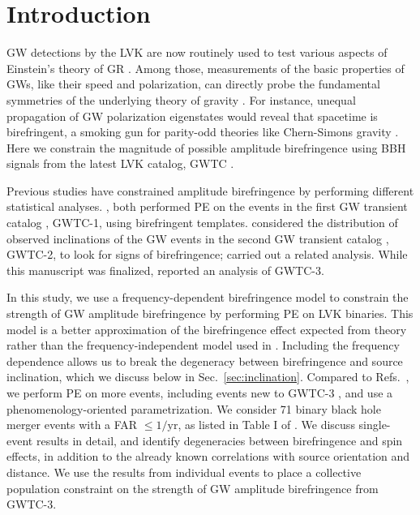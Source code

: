 \documentclass[aps,prd,twocolumn,superscriptaddress,preprintnumbers,nofootinbib]{revtex4-2}
\begin{document}
\section{Introduction}
\label{sec:Introduction}
\Ac{GW} detections by the \ac{LVK} \citep{LIGO, Virgo, KAGRA} are now routinely used to test various aspects of Einstein's theory of \ac{GR} \citep{LIGOScientific:2016lio,LIGOScientific:2018dkp,LIGOScientific:2021sio}.
Among those, measurements of the basic properties of \acp{GW}, like their speed and polarization, can directly probe the fundamental symmetries of the underlying theory of gravity \citep{Will:2018bme}.
For instance, unequal propagation of \ac{GW} polarization eigenstates would reveal that spacetime is birefringent, a smoking gun for parity-odd theories like Chern-Simons gravity \citep{Lue:1998mq,Jackiw:2003pm,Alexander:2009tp,Sopuerta:2009iy}.
Here we constrain the magnitude of possible amplitude birefringence using \ac{BBH} signals from the latest \ac{LVK} catalog, GWTC \citep{GWTC-3}.

Previous studies have constrained amplitude birefringence by performing different statistical analyses.
\citet{Yamada_2020}, \citet{Wang_2021} both performed \ac{PE} on the events in the first \ac{GW} transient catalog \citep{GWTC-1}, GWTC-1, using birefringent templates.
\citet{Okounkova_2022} considered the distribution of observed inclinations of the \ac{GW} events in the second \ac{GW} transient catalog \citep{GWTC-2}, GWTC-2, to look for signs of birefringence; \citet{Vitale:2022pmu} carried out a related analysis.
While this manuscript was finalized, \citet{Zhu:2023wci} reported an analysis of GWTC-3.

In this study, we use a frequency-dependent birefringence model to constrain the strength of \ac{GW} amplitude birefringence by performing \ac{PE} on \ac{LVK} binaries.
This model is a better approximation of the birefringence effect expected from theory rather than the frequency-independent model used in \citet{Okounkova_2022}.
Including the frequency dependence allows us to break the degeneracy between birefringence and source inclination, which we discuss below in Sec.~\ref{sec:inclination}.
Compared to Refs.~\citep{Yamada_2020,Wang_2021,Okounkova_2022}, we perform \ac{PE} on more events, including events new to GWTC-3 \citep{GWTC-3}, and use a phenomenology-oriented parametrization.
We consider 71 binary black hole merger events with a \ac{FAR} $\leq1/\mathrm{yr}$, as listed in Table I of \citet{GWTC-3_population}.
We discuss single-event results in detail, and identify degeneracies between birefringence and spin effects, in addition to the already known correlations with source orientation and distance.
We use the results from individual events to place a collective population constraint on the strength of \ac{GW} amplitude birefringence from GWTC-3.
\end{document}
